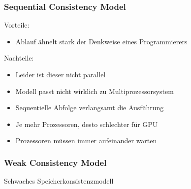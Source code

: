 \documentclass{sikslides}
\begin{document}
\begin{frame}
	\frametitle{Sequential Consistency Model}
	Vorteile:
	\begin{itemize}
		\item Ablauf ähnelt stark der Denkweise eines Programmierers\bigskip
	\end{itemize}

	Nachteile:
	\begin{itemize}
		\item Leider ist dieser nicht parallel\bigskip
		\item Modell passt nicht wirklich zu Multiprozessorsystem\bigskip
		\item Sequentielle Abfolge verlangsamt die Ausführung\bigskip
		\item Je mehr Prozessoren, desto schlechter für GPU\bigskip
		\item Prozessoren müssen immer aufeinander warten
	\end{itemize}
\bigskip
\end{frame}



\begin{frame}
	\frametitle{Weak Consistency Model}
Schwaches Speicherkonsistenzmodell
\end{frame}
\end{document}
